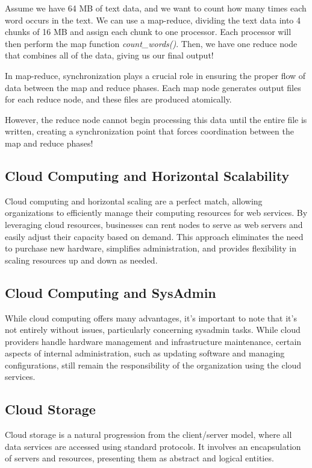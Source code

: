 \documentclass{report}
\newcommand{\exampleBegin}[1]{\begin{tcolorbox}[colback=blue!5!white,colframe=black!75!blue,title={Example:
      #1}]}
\newcommand{\exampleEnd}{\end{tcolorbox}}
\newcommand{\corollaryBegin}[1]{\begin{tcolorbox}[colback=teal!5!white,colframe=black!75!teal,title={Corollary:
      #1}]}
\newcommand{\corollaryEnd}{\end{tcolorbox}}
\begin{document}
\exampleBegin{Counting Cards}
Assume we have 64 MB of text data, and we want to count how many times each word occurs in the
text. We can use a map-reduce, dividing the text data into 4 chunks of 16 MB and assign each chunk
to one processor. Each processor will then perform the map function \textit{count\_words()}. Then,
we have one reduce node that combines all of the data, giving us our final output!
\exampleEnd


\corollaryBegin{Synchronization}
In map-reduce, synchronization plays a crucial role in ensuring the proper flow of data between the
map and reduce phases. Each map node generates output files for each reduce node, and these files
are produced atomically.

However, the reduce node cannot begin processing this data until the entire file is written,
creating a synchronization point that forces coordination between the map and reduce phases!
\corollaryEnd


\subsection{Cloud Computing and Horizontal Scalability}
Cloud computing and horizontal scaling are a perfect match, allowing organizations to efficiently
manage their computing resources for web services. By leveraging cloud resources, businesses can
rent nodes to serve as web servers and easily adjust their capacity based on demand. This approach
eliminates the need to purchase new hardware, simplifies administration, and provides flexibility in
scaling resources up and down as needed. 


\subsection{Cloud Computing and SysAdmin}
While cloud computing offers many advantages, it's important to note that it's not entirely without
issues, particularly concerning sysadmin tasks. While cloud providers handle hardware management and
infrastructure maintenance, certain aspects of internal administration, such as updating software
and managing configurations, still remain the responsibility of the organization using the cloud
services.


\subsection{Cloud Storage}
Cloud storage is a natural progression from the client/server model, where all data services are
accessed using standard protocols. It involves an encapsulation of servers and resources, presenting
them as abstract and logical entities.
\end{document}
